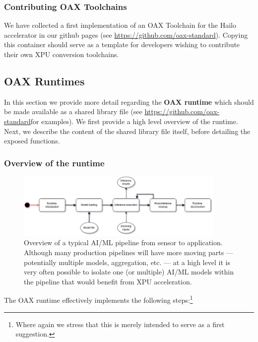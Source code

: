 \documentclass{article}
\newcommand{\oaxgit}{\href{https://github.com/oax-standard}{https://github.com/oax-standard}}
\begin{document}
\subsubsection{Contributing OAX Toolchains}

We have collected a first implementation of an OAX Toolchain for the Hailo accelerator in our github pages (see \oaxgit). Copying this container should serve as a template for developers wishing to contribute their own XPU conversion toolchains.

\subsection{OAX Runtimes}

In this section we provide more detail regarding the \textbf{OAX runtime} which should be made available as a shared library file (see \oaxgit for examples). We first provide a high level overview of the runtime. Next, we describe the content of the shared library file itself, before detailing the exposed functions.

\subsubsection{Overview of the runtime}

\begin{figure} [!htbp]
\centering
\includegraphics[width=0.9\textwidth]{img/runtime}
\caption{Overview of a typical AI/ML pipeline from sensor to application. Although many production pipelines will have more moving parts --- potentially multiple models, aggregation, etc. --- at a high level it is very often possible to isolate one (or multiple) AI/ML models within the pipeline that would benefit from XPU acceleration.}
\label{fig-pipeline}
\end{figure}

The OAX runtime effectively implements the following steps:\footnote{Where again we stress that this is merely intended to serve as a first suggestion.}
\end{document}
